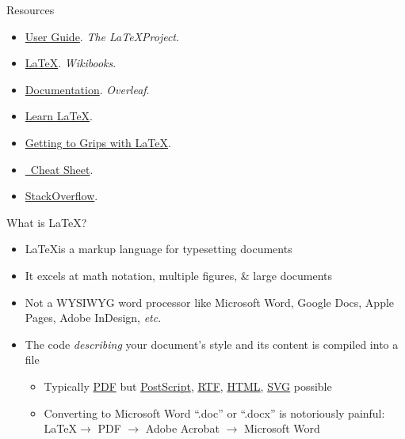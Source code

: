 \documentclass{cubeamer}
\begin{document}
\begin{frame}{Resources}
    \begin{itemize}
        \item \href{https://www.latex-project.org/help/documentation/usrguide.pdf}{User Guide}. \textit{The \LaTeX Project}.
        \item \href{https://en.wikibooks.org/wiki/LaTeX}{\LaTeX}. \textit{Wikibooks}.
        \item \href{https://www.overleaf.com/learn}{Documentation}. \textit{Overleaf}.
        \item \href{https://www.learnlatex.org/en/}{Learn \LaTeX}.
        \item \href{https://www.andy-roberts.net/writing/latex}{Getting to Grips with \LaTeX}.
        \item \href{http://wch.github.io/latexsheet/latexsheet.pdf}{\LaTeXe~Cheat Sheet}.
        \item \href{https://tex.stackexchange.com/}{StackOverflow}.
    \end{itemize}
\end{frame}

\begin{frame}{What is \LaTeX?}
    \begin{itemize}
        \item \LaTeX is a markup language for typesetting documents
        \item It excels at math notation, multiple figures, \& large documents
        \item Not a WYSIWYG word processor like Microsoft Word, Google Docs, Apple Pages, Adobe InDesign, \textit{etc}.
        \item The code \textit{describing} your document's style and its content is compiled into a file
        \begin{itemize}
            \item Typically \href{https://en.wikipedia.org/wiki/PDF}{PDF} but \href{https://en.wikipedia.org/wiki/PostScript}{PostScript}, \href{https://en.wikipedia.org/wiki/Rich_Text_Format}{RTF}, \href{https://en.wikipedia.org/wiki/HTML}{HTML}, \href{https://en.wikipedia.org/wiki/Scalable_Vector_Graphics}{SVG} possible
            \item Converting to Microsoft Word ``.doc'' or ``.docx'' is notoriously painful: \LaTeX $\rightarrow$ PDF $\rightarrow$ Adobe Acrobat $\rightarrow$ Microsoft Word
        \end{itemize}
    \end{itemize}
\end{frame}
\end{document}
